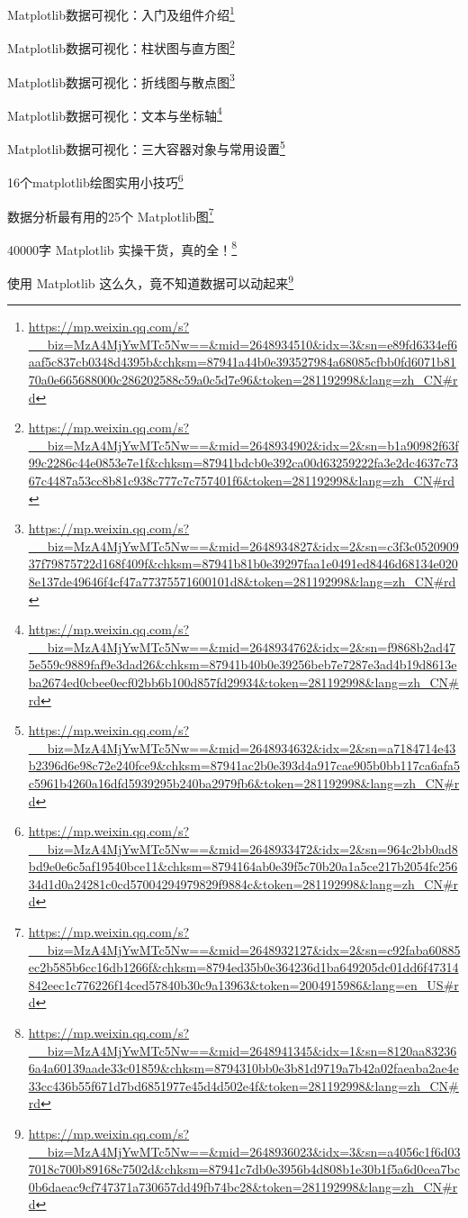 \documentclass[]{ctexbook}
\renewcommand{\href}[2]{#2\footnote{\url{#1}}}
\begin{document}
\href{https://mp.weixin.qq.com/s?__biz=MzA4MjYwMTc5Nw==\&mid=2648934510\&idx=3\&sn=e89fd6334ef6aaf5c837cb0348d4395b\&chksm=87941a44b0e393527984a68085cfbb0fd6071b8170a0e665688000c286202588c59a0c5d7e96\&token=281192998\&lang=zh_CN\#rd}{Matplotlib数据可视化：入门及组件介绍}

\href{https://mp.weixin.qq.com/s?__biz=MzA4MjYwMTc5Nw==\&mid=2648934902\&idx=2\&sn=b1a90982f63f99c2286c44e0853e7e1f\&chksm=87941bdcb0e392ca00d63259222fa3e2dc4637c7367c4487a53cc8b81c938c777c7c757401f6\&token=281192998\&lang=zh_CN\#rd}{Matplotlib数据可视化：柱状图与直方图}

\href{https://mp.weixin.qq.com/s?__biz=MzA4MjYwMTc5Nw==\&mid=2648934827\&idx=2\&sn=c3f3c052090937f79875722d168f409f\&chksm=87941b81b0e39297faa1e0491ed8446d68134e0208e137de49646f4cf47a77375571600101d8\&token=281192998\&lang=zh_CN\#rd}{Matplotlib数据可视化：折线图与散点图}

\href{https://mp.weixin.qq.com/s?__biz=MzA4MjYwMTc5Nw==\&mid=2648934762\&idx=2\&sn=f9868b2ad475e559c9889faf9e3dad26\&chksm=87941b40b0e39256beb7e7287e3ad4b19d8613eba2674ed0cbee0ecf02bb6b100d857fd29934\&token=281192998\&lang=zh_CN\#rd}{Matplotlib数据可视化：文本与坐标轴}

\href{https://mp.weixin.qq.com/s?__biz=MzA4MjYwMTc5Nw==\&mid=2648934632\&idx=2\&sn=a7184714e43b2396d6e98c72e240fce9\&chksm=87941ac2b0e393d4a917cae905b0bb117ca6afa5c5961b4260a16dfd5939295b240ba2979fb6\&token=281192998\&lang=zh_CN\#rd}{Matplotlib数据可视化：三大容器对象与常用设置}

\href{https://mp.weixin.qq.com/s?__biz=MzA4MjYwMTc5Nw==\&mid=2648933472\&idx=2\&sn=964c2bb0ad8bd9e0e6c5af19540bce11\&chksm=8794164ab0e39f5c70b20a1a5ce217b2054fc25634d1d0a24281c0cd57004294979829f9884c\&token=281192998\&lang=zh_CN\#rd}{​16个matplotlib绘图实用小技巧}

\href{https://mp.weixin.qq.com/s?__biz=MzA4MjYwMTc5Nw==\&mid=2648932127\&idx=2\&sn=c92faba60885ec2b585b6cc16db1266f\&chksm=8794ed35b0e364236d1ba649205dc01dd6f47314842eec1c776226f14ced57840b30c9a13963\&token=2004915986\&lang=en_US\#rd}{数据分析最有用的25个 Matplotlib图}

\href{https://mp.weixin.qq.com/s?__biz=MzA4MjYwMTc5Nw==\&mid=2648941345\&idx=1\&sn=8120aa832366a4a60139aade33c01859\&chksm=8794310bb0e3b81d9719a7b42a02faeaba2ae4e33cc436b55f671d7bd6851977e45d4d502e4f\&token=281192998\&lang=zh_CN\#rd}{40000字 Matplotlib 实操干货，真的全！}

\href{https://mp.weixin.qq.com/s?__biz=MzA4MjYwMTc5Nw==\&mid=2648936023\&idx=3\&sn=a4056c1f6d037018c700b89168c7502d\&chksm=87941c7db0e3956b4d808b1e30b1f5a6d0cea7bc0b6daeac9cf747371a730657dd49fb74bc28\&token=281192998\&lang=zh_CN\#rd}{使用 Matplotlib 这么久，竟不知道数据可以动起来}
\end{document}
